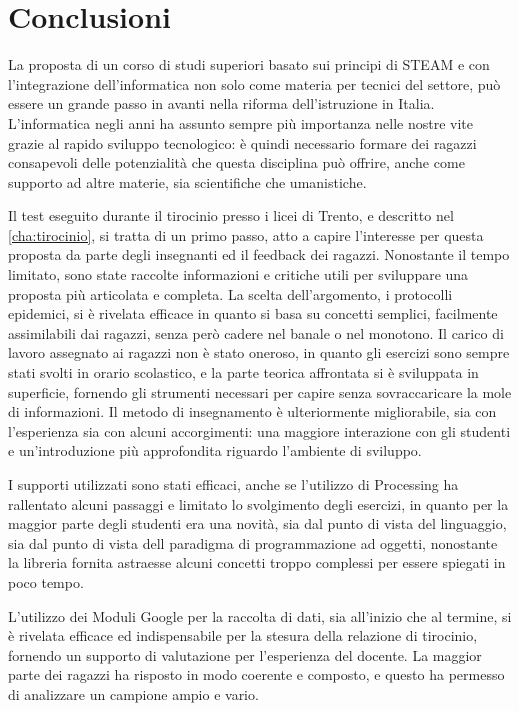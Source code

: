 \newpage
\chapter*{Conclusioni} %
\label{conclusioni}


La proposta di un corso di studi superiori basato sui principi di STEAM e con l'integrazione dell'informatica non solo come materia per tecnici del settore, può essere un grande passo in avanti nella riforma dell'istruzione in Italia. L'informatica negli anni ha assunto sempre più importanza nelle nostre vite grazie al rapido sviluppo tecnologico: è quindi necessario formare dei ragazzi consapevoli delle potenzialità che questa disciplina può offrire, anche come supporto ad altre materie, sia scientifiche che umanistiche.

Il test eseguito durante il tirocinio presso i licei di Trento, e descritto nel \autoref{cha:tirocinio}, si tratta di un primo passo, atto a capire l'interesse per questa proposta da parte degli insegnanti ed il feedback dei ragazzi. Nonostante il tempo limitato, sono state raccolte informazioni e critiche utili per sviluppare una proposta più articolata e completa. La scelta dell'argomento, i protocolli epidemici, si è rivelata efficace in quanto si basa su concetti semplici, facilmente assimilabili dai ragazzi, senza però cadere nel banale o nel monotono. Il carico di lavoro assegnato ai ragazzi non è stato oneroso, in quanto gli esercizi sono sempre stati svolti in orario scolastico, e la parte teorica affrontata si è sviluppata in superficie, fornendo gli strumenti necessari per capire senza sovraccaricare la mole di informazioni. Il metodo di insegnamento è ulteriormente migliorabile, sia con l'esperienza sia con alcuni accorgimenti: una maggiore interazione con gli studenti e un'introduzione più approfondita riguardo l'ambiente di sviluppo.

I supporti utilizzati sono stati efficaci, anche se l'utilizzo di Processing ha rallentato alcuni passaggi e limitato lo svolgimento degli esercizi, in quanto per la maggior parte degli studenti era una novità, sia dal punto di vista del linguaggio, sia dal punto di vista dell paradigma di programmazione ad oggetti, nonostante la libreria fornita astraesse alcuni concetti troppo complessi per essere spiegati in poco tempo. 

L'utilizzo dei Moduli Google per la raccolta di dati, sia all'inizio che al termine, si è rivelata efficace ed indispensabile per la stesura della relazione di tirocinio, fornendo un supporto di valutazione per l'esperienza del docente. La maggior parte dei ragazzi ha risposto in modo coerente e composto, e questo ha permesso di analizzare un campione ampio e vario. 

